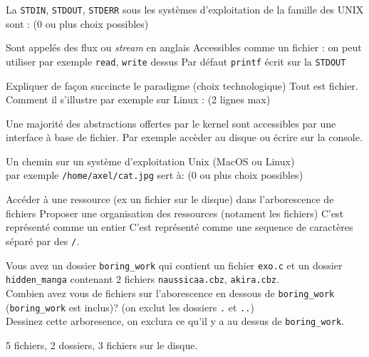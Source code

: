 \documentclass[11pt,a4paper,addpoint,answers]{exam}
\begin{document}
  \begin{questions}

    \question[1] La \texttt{STDIN}, \texttt{STDOUT}, \texttt{STDERR} sous les systèmes d'exploitation de la famille des UNIX sont :
    (0 ou plus choix possibles)
    \begin{checkboxes}
        \CorrectChoice Sont appelés des flux ou \textit{stream} en anglais
        \CorrectChoice Accessibles comme un fichier : on peut utiliser par exemple \texttt{read}, \texttt{write} dessus
        \CorrectChoice Par défaut \texttt{printf} écrit sur la \texttt{STDOUT}
      \end{checkboxes}

    \question[2] Expliquer de façon succincte le paradigme (choix technologique) \og{}Tout est fichier\fg{}.
    Comment il s'illustre par exemple sur Linux : (2 lignes max)
    \ifprintanswers
    \begin{solution}
        Une majorité des abstractions offertes par le kernel sont accessibles par une interface à
        base de fichier. Par exemple accèder au disque ou écrire sur la console.
    \end{solution}
    \else
    \vspace{2in}
    \fi

    \question[2] Un chemin sur un système d'exploitation Unix (MacOS ou Linux)\\
    par exemple \texttt{/home/axel/cat.jpg} sert à: (0 ou plus choix possibles)
    \begin{checkboxes}
        \CorrectChoice Accéder à une ressource (ex un fichier sur le disque) dans l'arborescence de fichiers
        \CorrectChoice Proposer une organisation des ressources (notament les fichiers)
        \choice C'est représenté comme un entier
        \CorrectChoice C'est représenté comme une sequence de caractères séparé par des \texttt{/}.
    \end{checkboxes}
    \newpage

    \question[2] Vous avez un dossier \texttt{boring\_work} qui contient un fichier \texttt{exo.c} et un dossier\\
    \texttt{hidden\_manga} contenant 2 fichiers \texttt{naussicaa.cbz}, \texttt{akira.cbz}.\\
    Combien avez vous de fichiers sur l'aborescence en dessous de \texttt{boring\_work} (\texttt{boring\_work} est inclus)?
    (on exclut les dossiers \texttt{.} et \texttt{..})\\
    Dessinez cette arboresence, on exclura ce qu'il y a au dessus de \texttt{boring\_work}.
    \ifprintanswers
    \begin{solution}
        5 fichiers, 2 dossiers, 3 fichiers sur le disque.
    \end{solution}
    \else
    \vspace{3in}
    \fi


\end{questions}
\end{document}
